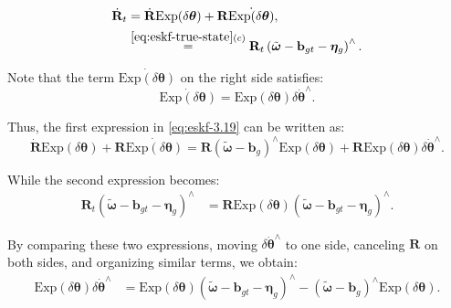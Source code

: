\begin{equation}\label{eq:eskf-3.19}
	\begin{aligned}
		\dot{\mathbf{R}}_t &= \dot{\mathbf{R}} \mathrm{Exp} (\delta \boldsymbol{\theta}) + \mathbf{R} 
		\dot{\mathrm{Exp}(\delta \boldsymbol{\theta})},  \\
		&\buildrel{\ref{eq:eskf-true-state}(c)}\over=  \mathbf{R}_t \left( \tilde{\boldsymbol{\omega}} - 
		\mathbf{b}_{gt} - \boldsymbol{\eta}_g \right) ^\wedge.
	\end{aligned}
\end{equation}

Note that the term $\dot{\mathrm{Exp}(\delta \boldsymbol{\theta})}$ on the right side satisfies:
\begin{equation}
	\dot{\mathrm{Exp}(\delta \boldsymbol{\theta})} = \mathrm{Exp}(\delta \boldsymbol{\theta}) \delta 
	\dot{\boldsymbol{\theta}}^\wedge.
\end{equation} 

Thus, the first expression in \eqref{eq:eskf-3.19} can be written as:
\begin{equation}\label{key}
	\dot{\mathbf{R}} \mathrm{Exp} (\delta \boldsymbol{\theta}) + \mathbf{R} \dot{\mathrm{Exp}(\delta 
		\boldsymbol{\theta})} = \mathbf{R} (\tilde{\boldsymbol{\omega}}-\mathbf{b}_g)^\wedge 
	\mathrm{Exp}(\delta \boldsymbol{\theta}) + \mathbf{R} \mathrm{Exp}(\delta \boldsymbol{\theta} ) 
	\delta \dot{\boldsymbol{\theta}}^\wedge.
\end{equation}

While the second expression becomes:
\begin{equation}\label{key}
	\begin{aligned}
		\mathbf{R}_t \left( \tilde{\boldsymbol{\omega}} - \mathbf{b}_{gt} - \boldsymbol{\eta}_g \right)^\wedge 
		&= \mathbf{R}  \mathrm{Exp} (\delta \boldsymbol{\theta}) \left( \tilde{\boldsymbol{\omega}} - 
		\mathbf{b}_{gt} - \boldsymbol{\eta}_g \right)^\wedge.
	\end{aligned}
\end{equation}

By comparing these two expressions, moving $\delta \dot{\boldsymbol{\theta}}^\wedge$ to one side, canceling $\mathbf{R}$ on both sides, and organizing similar terms, we obtain:
\begin{equation}
	\begin{aligned}
		\mathrm{Exp} (\delta \boldsymbol{\theta}) \delta \dot{\boldsymbol{\theta}}^\wedge &= 
		\mathrm{Exp} (\delta \boldsymbol{\theta}) \left( \tilde{\boldsymbol{\omega}} - \mathbf{b}_{gt} - 
		\boldsymbol{\eta}_g \right)^\wedge - (\tilde{\boldsymbol{\omega}}-\mathbf{b}_g)^\wedge 
		\mathrm{Exp}(\delta \boldsymbol{\theta}).
	\end{aligned}
\end{equation}

